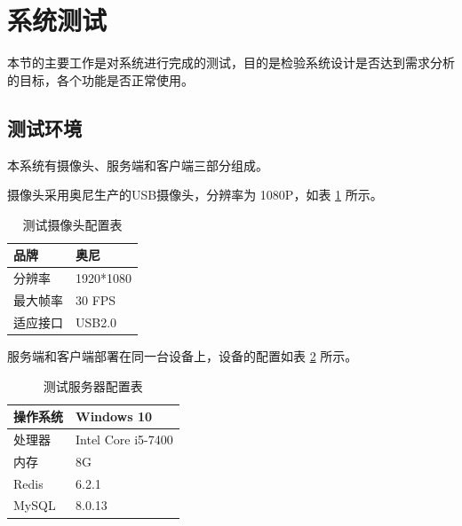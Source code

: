 


\section{系统测试}
本节的主要工作是对系统进行完成的测试，目的是检验系统设计是否达到需求分析的目标，各个功能是否正常使用。




\subsection{测试环境}
本系统有摄像头、服务端和客户端三部分组成。

摄像头采用奥尼生产的USB摄像头，分辨率为 1080P，如表 \ref{Tab:cam} 所示。
\begin{longtable}[ht]{|l|l|}
    \caption{测试摄像头配置表}
    \label{Tab:cam}\\
    \hline
    品牌&奥尼\\
    \hline
    分辨率&1920*1080\\
    \hline
    最大帧率&30 FPS\\
    \hline
    适应接口&USB2.0\\
    \hline
    \end{longtable}

服务端和客户端部署在同一台设备上，设备的配置如表 \ref{Tab:conf} 所示。

\begin{longtable}[ht]{|l|l|}
\caption{测试服务器配置表}
\label{Tab:conf}\\
\hline
操作系统&Windows 10\\
\hline
处理器&Intel Core i5-7400\\
\hline
内存&8G\\
\hline
Redis&6.2.1 \\
\hline
MySQL&8.0.13\\
\hline
\end{longtable}

